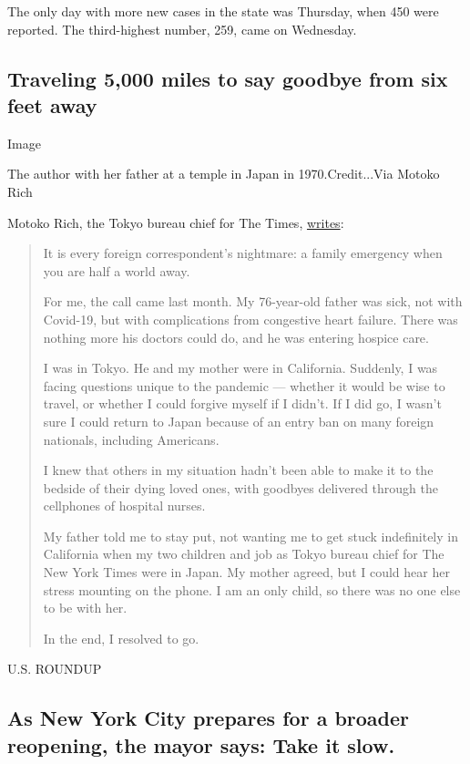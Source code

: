 The only day with more new cases in the state was Thursday, when 450
were reported. The third-highest number, 259, came on Wednesday.

\hypertarget{traveling-5000-miles-to-say-goodbye-from-six-feet-away}{%
\subsection{Traveling 5,000 miles to say goodbye from six feet
away}\label{traveling-5000-miles-to-say-goodbye-from-six-feet-away}}

Image

The author with her father at a temple in Japan in 1970.Credit...Via
Motoko Rich

Motoko Rich, the Tokyo bureau chief for The Times,
\href{https://www.nytimes.com/2020/06/19/reader-center/coronavirus-last-goodbyes.html}{writes}:

\begin{quote}
It is every foreign correspondent's nightmare: a family emergency when
you are half a world away.

For me, the call came last month. My 76-year-old father was sick, not
with Covid-19, but with complications from congestive heart failure.
There was nothing more his doctors could do, and he was entering hospice
care.

I was in Tokyo. He and my mother were in California. Suddenly, I was
facing questions unique to the pandemic --- whether it would be wise to
travel, or whether I could forgive myself if I didn't. If I did go, I
wasn't sure I could return to Japan because of an entry ban on many
foreign nationals, including Americans.

I knew that others in my situation hadn't been able to make it to the
bedside of their dying loved ones, with goodbyes delivered through the
cellphones of hospital nurses.

My father told me to stay put, not wanting me to get stuck indefinitely
in California when my two children and job as Tokyo bureau chief for The
New York Times were in Japan. My mother agreed, but I could hear her
stress mounting on the phone. I am an only child, so there was no one
else to be with her.

In the end, I resolved to go.
\end{quote}

U.S. ROUNDUP

\hypertarget{as-new-york-city-prepares-for-a-broader-reopening-the-mayor-says-take-it-slow}{%
\subsection{As New York City prepares for a broader reopening, the mayor
says: Take it
slow.}\label{as-new-york-city-prepares-for-a-broader-reopening-the-mayor-says-take-it-slow}}

